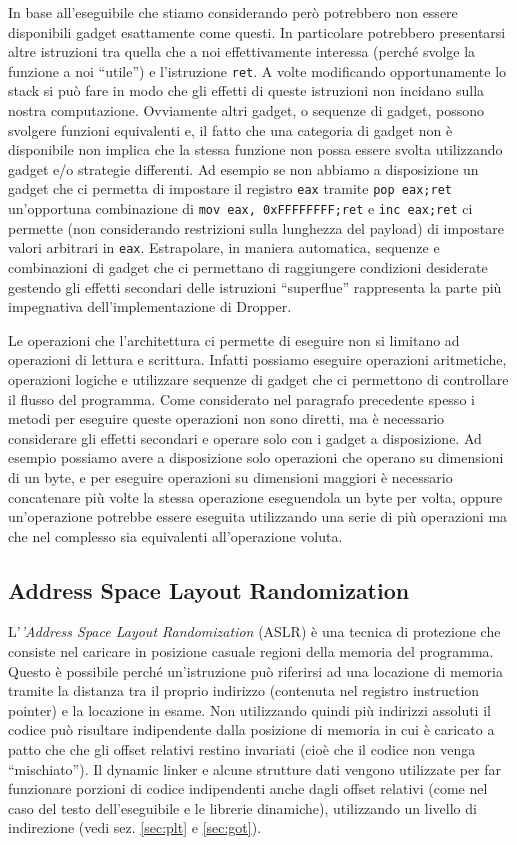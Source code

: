 In base all'eseguibile che stiamo considerando però potrebbero non
essere disponibili gadget esattamente come questi.  In particolare
potrebbero presentarsi altre istruzioni tra quella che a noi
effettivamente interessa (perché svolge la funzione a noi ``utile'') e
l'istruzione \lstinline{ret}. A volte modificando opportunamente lo
stack si può fare in modo che gli effetti di queste istruzioni non
incidano sulla nostra computazione. Ovviamente altri gadget, o
sequenze di gadget, possono svolgere funzioni equivalenti e, il fatto
che una categoria di gadget non è disponibile non implica che la
stessa funzione non possa essere svolta utilizzando gadget e/o
strategie differenti. Ad esempio se non abbiamo a disposizione un
gadget che ci permetta di impostare il registro \lstinline{eax}
tramite \lstinline{pop eax;ret} un'opportuna combinazione di
\lstinline{mov eax, 0xFFFFFFFF;ret} e \lstinline{inc eax;ret} ci
permette (non considerando restrizioni sulla lunghezza del payload) di
impostare valori arbitrari in \lstinline{eax}. Estrapolare, in maniera
automatica, sequenze e combinazioni di gadget che ci permettano di
raggiungere condizioni desiderate gestendo gli effetti secondari delle
istruzioni ``superflue'' rappresenta la parte più impegnativa
dell'implementazione di Dropper.

Le operazioni che l'architettura ci permette di eseguire non si
limitano ad operazioni di lettura e scrittura. Infatti possiamo
eseguire operazioni aritmetiche, operazioni logiche e utilizzare
sequenze di gadget che ci permettono di controllare il flusso del
programma. Come considerato nel paragrafo precedente spesso i metodi
per eseguire queste operazioni non sono diretti, ma è necessario
considerare gli effetti secondari e operare solo con i gadget a
disposizione. Ad esempio possiamo avere a disposizione solo operazioni
che operano su dimensioni di un byte, e per eseguire operazioni su
dimensioni maggiori è necessario concatenare più volte la stessa
operazione eseguendola un byte per volta, oppure un'operazione
potrebbe essere eseguita utilizzando una serie di più operazioni ma
che nel complesso sia equivalenti all'operazione voluta.

\subsection{Address Space Layout Randomization}

L'\emph{'Address Space Layout Randomization} (ASLR) è una tecnica di
protezione che consiste nel caricare in posizione casuale regioni
della memoria del programma. Questo è possibile perché un'istruzione
può riferirsi ad una locazione di memoria tramite la distanza tra il
proprio indirizzo (contenuta nel registro instruction pointer) e la
locazione in esame. Non utilizzando quindi più indirizzi assoluti il
codice può risultare indipendente dalla posizione di memoria in cui è
caricato a patto che che gli offset relativi restino invariati (cioè
che il codice non venga ``mischiato''). Il dynamic linker e alcune
strutture dati vengono utilizzate per far funzionare porzioni di
codice indipendenti anche dagli offset relativi (come nel caso del
testo dell'eseguibile e le librerie dinamiche), utilizzando un livello
di indirezione (vedi sez. \ref{sec:plt} e \ref{sec:got}).

